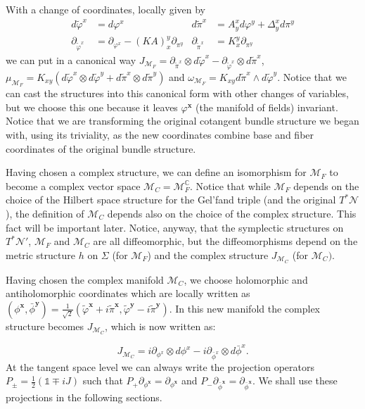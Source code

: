 \documentclass[12pt]{article}%
\begin{document}
With a change of coordinates, locally given by
\begin{align}
\label{eq:changeOfCoordinates}
d{\tilde{\varphi}^x}&=d{\varphi^x} &
d{\tilde{\pi}^x}&=A^x_yd{\varphi^y}+\Delta^x_yd{\pi^y} 
\\
\partial_{\tilde{\varphi}^x}&=\partial_{\varphi^x}- (K A)^y_x\partial_{\pi^y} &
\partial_{\tilde{\pi}^x}&=K^y_x\partial_{{\pi}^y}
\end{align}
 we can put in a canonical way $J_{\mathcal{M}_F}=\partial_{\tilde{\pi}^x}\otimes d\tilde{\varphi}^x-\partial_{\tilde{\varphi}^x}\otimes d\tilde{\pi}^x$, $\mu_{\mathcal{M}_F}=K_{xy}(d\tilde{\varphi}^x\otimes d\tilde{\varphi}^y+d\tilde{\pi}^x\otimes d\tilde{\pi}^y)$ and $\omega_{\mathcal{M}_F}=K_{xy} d\tilde{\pi}^x\wedge d\tilde{\varphi}^y$. Notice that we can cast the structures into this canonical form with other changes of variables, but we choose this one because it leaves $\varphi^\mathbf{x}$ (the manifold of fields) invariant. Notice that we are transforming the original cotangent bundle structure we began with, using its triviality, as the new coordinates combine base and fiber coordinates of the original bundle structure.

Having chosen a complex structure, we can define an isomorphism for $\mathcal{M}_F$ to become a complex vector space $\mathcal{M}_C=\mathcal{M}_F^{\mathbb{C}}$. Notice that while $\mathcal{M}_F$ depends on the choice of the Hilbert space structure for the Gel'fand triple (and the original $T^*\mathcal{N}$), the definition of $\mathcal{M}_C$ depends also on the choice of the complex structure.  This fact will be important later. Notice, anyway, that the symplectic structures on $T^*\mathcal{N}'$, $\mathcal{M}_F$ and $\mathcal{M}_C$ are all diffeomorphic, but the diffeomorphisms depend on the metric structure $h$ on $\Sigma$ (for $\mathcal{M}_F$)  and the complex structure $J_{\mathcal{M}_C}$ (for $\mathcal{M}_C)$. 

 Having chosen the complex manifold $\mathcal{M}_C$, we choose holomorphic and antiholomorphic  coordinates which are locally written as $(\phi^{\mathbf{x}},\bar{\phi}^{\mathbf{y}})=\frac{1}{\sqrt{2}}(\tilde{\varphi}^{\mathbf{x}}+i\tilde{\pi}^{\mathbf{x}},\tilde{\varphi}^{\mathbf{y}}-i\tilde{\pi}^{\mathbf{y}})$. In this new manifold the complex structure becomes  $J_{\mathcal{M}_C}$, which  is now written as: 

\begin{equation}
\label{eq:complexholom}
J_{\mathcal{M}_C}=i \partial_{\phi^x}\otimes d\phi^x-i \partial_{\bar{\phi}^x}\otimes d\bar{\phi}^x.
\end{equation}
At the tangent space level we can always write the projection operators $P_{\pm}=\frac12(\mathds{1}\mp iJ)$ such that $P_{+}\partial_{\phi^{\mathbf{x}}}=\partial_{\phi^{\mathbf{x}}}$ and $P_{-}\partial_{\bar\phi^{\mathbf{x}}}=\partial_{\bar\phi^{\mathbf{x}}}$. We shall use these projections in the following sections.
\end{document}
